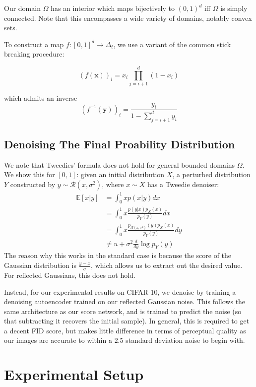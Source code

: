 \documentclass{article}
\theoremstyle{plain}
\theoremstyle{definition}
\theoremstyle{remark}
\newcommand{\E}{\mathbb{E}}
\renewcommand{\vec}{\mathbf}
\begin{document}
Our domain $\Omega$ has an interior which maps bijectively to $(0, 1)^d$ iff $\Omega$ is simply connected. Note that this encompasses a wide variety of domains, notably convex sets.

To construct a map $f: [0, 1]^d \to \overline{\Delta}_t$, we use a variant of the common stick breaking procedure:

\begin{equation}
    (f(\vec{x}))_i = x_i \prod_{j = i + 1}^d (1 - x_i)
\end{equation}

which admits an inverse
\begin{equation}
    (f^{-1}(\vec{y}))_i = \frac{y_i}{1 - \sum_{j = i + 1}^d y_i}
\end{equation}

\subsection{Denoising The Final Proability Distribution} \label{sec:app:prac:denoise}

We note that Tweedies' formula \citep{Efron2011TweediesFA} does not hold for general bounded domains $\Omega$. We show this for $[0, 1]$: given an initial distribution $X$, a perturbed distribution $Y$ constructed by $y \sim \mathcal{R}(x, \sigma^2)$, where $x \sim X$ has a Tweedie denoiser:
\begin{align}
    \E[x | y] &= \int_0^1 x p(x | y) dx\\
    &= \int_0^1 x \frac{p(y | x)p_X(x)}{p_Y(y)} dx\\
    &= \int_0^1 x \frac{p_{\mathcal{R}(x, \sigma^2)}(y) p_X (x)}{p_Y(y)} dy\\
    &\neq u + \sigma^2 \frac{d}{dy} \log p_Y(y)
\end{align}
The reason why this works in the standard case is because the score of the Gaussian distribution is $\frac{y - x}{\sigma}$, which allows us to extract out the desired value. For reflected Gaussians, this does not hold.

Instead, for our experimental results on CIFAR-10, we denoise by training a denoising autoencoder \citep{Vincent2008ExtractingAC} trained on our reflected Gaussian noise. This follows the same architecture as our score network, and is trained to predict the noise (so that subtracting it recovers the initial sample). In general, this is required to get a decent FID score, but makes little difference in terms of perceptual quality as our images are accurate to within a $2.5$ standard deviation noise to begin with. \section{Experimental Setup}
\end{document}
